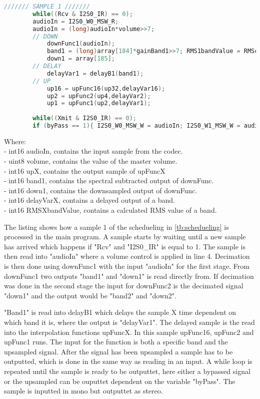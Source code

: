 \begin{lstlisting}[language=C, caption = {Sample 1},label={listingSample}]
/////// SAMPLE 1 ///////
    	while((Rcv & I2S0_IR) == 0); 							
	    audioIn = I2S0_W0_MSW_R;  
	    audioIn = (long)audioIn*volume>>7;	
	    // DOWN
		    downFunc1(audioIn); 			
			band1 = (long)array[184]*gainBand1>>7; RMS1bandValue = RMScalculate(RMS1bandBuffer,band1,&RMS1bandPtr, &RMS1bandSum);				
			down1 = array[185];							
		// DELAY			
			delayVar1 = delayB1(band1);
		// UP
			up16 = upFunc16(up32,delayVar16);
			up2 = upFunc2(up4,delayVar2);
			up1 = upFunc1(up2,delayVar1);
		
	    while((Xmit & I2S0_IR) == 0);  					
		if (byPass == 1){ I2S0_W0_MSW_W = audioIn; I2S0_W1_MSW_W = audioIn;} else { I2S0_W0_MSW_W = up1; I2S0_W1_MSW_W = up1;} 
\end{lstlisting}
Where: \\
- int16 audioIn, contains the input sample from the codec. \\
- uint8 volume, contains the value of the master volume. \\
- int16 upX, contains the output sample of upFuncX \\
- int16 band1, contains the spectral subtracted output of downFunc. \\
- int16 down1, contains the downsampled output of downFunc. \\
- int16 delayVarX, contains a delayed output of a band. \\
- int16 RMSXbandValue, contains a calculated RMS value of a band.

The listing shows how a sample 1 of the schedueling in \autoref{tb:schedueling} is processed in the main program. A sample starts by waiting until a new sample has arrived which happens if "Rcv" and "I2S0\_IR" is equal to 1. The sample is then read into "audioIn" where a volume control is applied in line 4. Decimation is then done using downFunc1 with the input "audioIn" for the first stage. From downFunc1 two outputs "band1" and "down1" is read directly from. If decimation was done in the second stage the input for downFunc2 is the decimated signal "down1" and the output would be "band2" and "down2".

"Band1" is read into delayB1 which delays the sample X time dependent on which band it is, where the output is "delayVar1". The delayed sample is the read into the interpolation functions upFuncX. In this sample upFunc16, upFunc2 and upFunc1 runs. The input for the function is both a specific band and the upsampled signal. After the signal has been upsampled a sample has to be outputted, which is done in the same way as reading in an input. A while loop is repeated until the sample is ready to be outputtet, here either a bypassed signal or the upsampled can be ouputtet dependent on the variable "byPass". The sample is inputted in mono but outputtet as stereo. 



